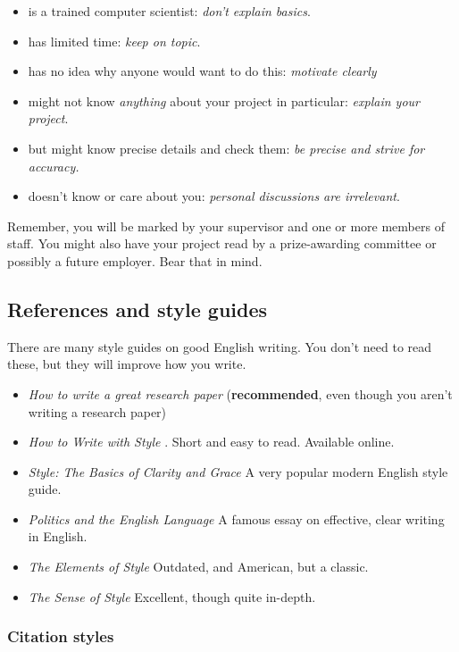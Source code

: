 \documentclass{l4proj}
\begin{document}
\begin{itemize}
    \item
    is a trained computer scientist: \emph{don't explain basics}.
    \item
    has limited time: \emph{keep on topic}.
    \item
    has no idea why anyone would want to do this: \emph{motivate clearly}
    \item
    might not know \emph{anything} about your project in particular:
    \emph{explain your project}.
    \item
    but might know precise details and check them: \emph{be precise and
    strive for accuracy.}
    \item
    doesn't know or care about you: \emph{personal discussions are
    irrelevant}.
\end{itemize}

Remember, you will be marked by your supervisor and one or more members
of staff. You might also have your project read by a prize-awarding
committee or possibly a future employer. Bear that in mind.

\subsection{References and style guides}
There are many style guides on good English writing. You don't need to
read these, but they will improve how you write.

\begin{itemize}
    \item
    \emph{How to write a great research paper} \cite{Pey17} (\textbf{recommended}, even though you aren't writing a research paper)
    \item
    \emph{How to Write with Style} \cite{Von80}. Short and easy to read. Available online.
    \item
    \emph{Style: The Basics of Clarity and Grace} \cite{Wil09} A very popular modern English style guide.
    \item
    \emph{Politics and the English Language} \cite{Orw68}  A famous essay on effective, clear writing in English.
    \item
    \emph{The Elements of Style} \cite{StrWhi07} Outdated, and American, but a classic.
    \item
    \emph{The Sense of Style} \cite{Pin15} Excellent, though quite in-depth.
\end{itemize}

\subsubsection{Citation styles}
\end{document}
